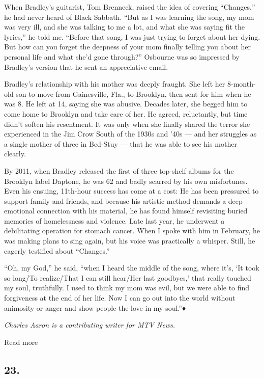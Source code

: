 When Bradley's guitarist, Tom Brenneck, raised the idea of covering
``Changes,'' he had never heard of Black Sabbath. ``But as I was
learning the song, my mom was very ill, and she was talking to me a lot,
and what she was saying fit the lyrics,'' he told me. ``Before that
song, I was just trying to forget about her dying. But how can you
forget the deepness of your mom finally telling you about her personal
life and what she'd gone through?'' Osbourne was so impressed by
Bradley's version that he sent an appreciative email.

Bradley's relationship with his mother was deeply fraught. She left her
8-month-old son to move from Gainesville, Fla., to Brooklyn, then sent
for him when he was 8. He left at 14, saying she was abusive. Decades
later, she begged him to come home to Brooklyn and take care of her. He
agreed, reluctantly, but time didn't soften his resentment. It was only
when she finally shared the terror she experienced in the Jim Crow South
of the 1930s and '40s --- and her struggles as a single mother of three
in Bed-Stuy --- that he was able to see his mother clearly.

By 2011, when Bradley released the first of three top-shelf albums for
the Brooklyn label Daptone, he was 62 and badly scarred by his own
misfortunes. Even his ensuing, 11th-hour success has come at a cost: He
has been pressured to support family and friends, and because his
artistic method demands a deep emotional connection with his material,
he has found himself revisiting buried memories of homelessness and
violence. Late last year, he underwent a debilitating operation for
stomach cancer. When I spoke with him in February, he was making plans
to sing again, but his voice was practically a whisper. Still, he
eagerly testified about ``Changes.''

``Oh, my God,'' he said, ``when I heard the middle of the song, where
it's, `It took so long/To realize/That I can still hear/Her last
goodbyes,' that really touched my soul, truthfully. I used to think my
mom was evil, but we were able to find forgiveness at the end of her
life. Now I can go out into the world without animosity or anger and
show people the love in my soul.''♦

\emph{Charles Aaron is a contributing writer for MTV News.}

Read more

\hypertarget{23}{%
\subsection{23.}\label{23}}

